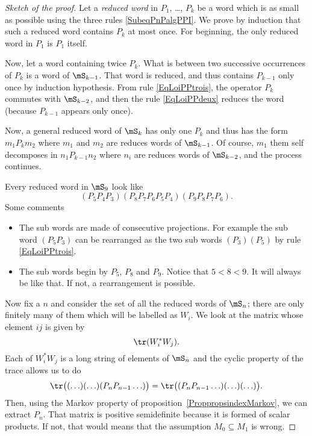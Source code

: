 \begin{proof}[Sketch of the proof]
Let a \emph{reduced word} in $P_1$, \ldots, $P_k$ be a word which is as small as possible using the three rules \eqref{SubeqPnPalgPPI}. We prove by induction that such a reduced word contains $P_k$ at most once. For beginning, the only reduced word in $P_1$ is $P_1$ itself.

Now, let a word containing twice $P_k$. What is between two successive occurrences of $P_k$ is a word of $\mS_{k-1}$. That word is reduced, and thus contains $P_{k-1}$ only once by induction hypothesis. From rule \eqref{EqLoiPPtrois}, the operator $P_k$ commutes with $\mS_{k-2}$, and then the rule \eqref{EqLoiPPdeux} reduces the word (because $P_{k-1}$ appears only once).


Now, a general reduced word of $\mS_k$ has only one $P_k$ and thus has the form $m_1 P_k m_2$ where $m_1$ and $m_2$ are reduces words of $\mS_{k-1}$. Of course, $m_1$ them self decomposes in $n_{1} P_{k-1} n_2$ where $n_i$ are reduces words of $\mS_{k-2}$, and the process continues.

Every reduced word in $\mS_9$ look like
\begin{equation}
	(P_5P_4P_3)(P_8P_7P_6P_5P_4)(P_9P_8P_7P_6).
\end{equation}
Some comments
\begin{itemize}
\item The sub words are made of consecutive projections. For example the sub word $(P_5P_3)$ can be rearranged as the two sub words $(P_3)(P_5)$ by rule \eqref{EqLoiPPtrois}.
\item The sub words begin by $P_5$, $P_8$ and $P_9$. Notice that $5<8<9$. It will always be like that. If not, a rearrangement is possible.
\end{itemize}
Now fix a $n$ and consider the set of all the reduced words of $\mS_n$; there are only finitely many of them which will be labelled as $W_i$. We look at the matrix whose element $ij$ is given by
\begin{equation}		\label{EqMtrWWtr}
	\tr(W_i^*W_j).
\end{equation}
Each of $W_i^*W_j$ is a long string of elements of $\mS_n$ and the cyclic property of the trace allows us to do
\begin{equation}
	\tr\big( (\ldots)(\ldots)(P_nP_{n-1}\ldots) \big)=\tr\big( (P_nP_{n-1}\ldots)(\ldots)(\ldots)  \big).
\end{equation}
Then, using the Markov property of proposition~\ref{ProppropsindexMarkov}, we can extract $P_n$. That matrix is positive semidefinite because it is formed of scalar products. If not, that would means that the assumption $M_0\subseteq M_1$ is wrong.

\end{proof}

